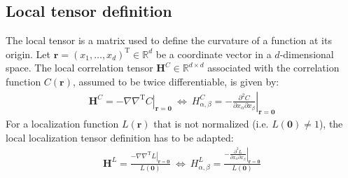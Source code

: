 \documentclass[12pt]{scrartcl}
\begin{document}
\subsection{Local tensor definition}
The local tensor is a matrix used to define the curvature of a function at its origin. Let $\mathbf{r} = \left(x_1,\dots,x_d\right)^\mathrm{T} \in \mathbb{R}^d$ be a coordinate vector in a $d$-dimensional space. The local correlation tensor $\mathbf{H}^C \in \mathbb{R}^{d \times d}$ associated with the correlation function $C(\mathbf{r})$, assumed to be twice differentiable, is given by:
\begin{align}
\mathbf{H}^C = - \left.\nabla \nabla^\mathrm{T} C\right|_{\mathbf{r}=\mathbf{0}} \ \Leftrightarrow \ H^C_{\alpha,\beta} = - \left.\frac{\partial^2 C}{\partial x_\alpha \partial x_\beta}\right|_{\mathbf{r}=\mathbf{0}}
\end{align}
For a localization function $L(\mathbf{r})$ that is not normalized (i.e. $L(\mathbf{0}) \ne 1$), the local localization tensor definition has to be adapted:
\begin{align}
\mathbf{H}^L = \frac{- \left.\nabla \nabla^\mathrm{T} L\right|_{\mathbf{r}=\mathbf{0}}}{L(\mathbf{0})}\ \Leftrightarrow \ H^L_{\alpha,\beta} = \frac{\displaystyle - \left.\frac{\partial^2 L}{\partial x_\alpha \partial x_\beta}\right|_{\mathbf{r}=\mathbf{0}}}{L(\mathbf{0})}
\end{align}
\end{document}
